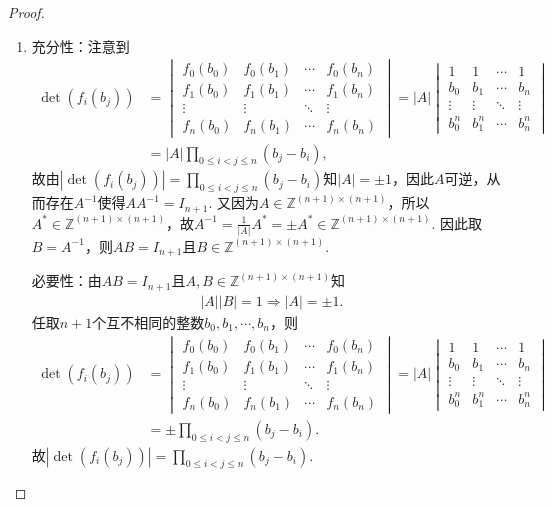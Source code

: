\documentclass[../../main.tex]{subfiles}
\begin{document}
\begin{proof}
\begin{enumerate}[(1)]
\item {\heiti 充分性：}注意到
\begin{align*}
\det(f_i(b_j))&=\begin{vmatrix}
f_0(b_0)&f_0(b_1)&\cdots&f_0(b_n)\\
f_1(b_0)&f_1(b_1)&\cdots&f_1(b_n)\\
\vdots&\vdots&\ddots&\vdots\\
f_n(b_0)&f_n(b_1)&\cdots&f_n(b_n)
\end{vmatrix}=|A|\begin{vmatrix}
1&1&\cdots&1\\
b_0&b_1&\cdots&b_n\\
\vdots&\vdots&\ddots&\vdots\\
b_0^n&b_1^n&\cdots&b_n^n
\end{vmatrix}\\
&=|A|\prod_{0\le i<j\le n}(b_j-b_i),
\end{align*}
故由$|\det(f_i(b_j))|=\prod_{0\le i<j\le n}(b_j-b_i)$知$|A|=\pm 1$，因此$A$可逆，从而存在$A^{-1}$使得$AA^{-1}=I_{n+1}$. 又因为$A\in \mathbb{Z}^{(n+1)\times(n+1)}$，所以$A^*\in \mathbb{Z}^{(n+1)\times(n+1)}$，故$A^{-1}=\frac{1}{|A|}A^*=\pm A^*\in \mathbb{Z}^{(n+1)\times(n+1)}$. 因此取$B=A^{-1}$，则$AB=I_{n+1}$且$B\in \mathbb{Z}^{(n+1)\times(n+1)}$.

{\heiti 必要性：}由$AB=I_{n+1}$且$A,B\in \mathbb{Z}^{(n+1)\times(n+1)}$知
\begin{align*}
|A||B|=1\Longrightarrow |A|=\pm 1.
\end{align*}
任取$n+1$个互不相同的整数$b_0,b_1,\cdots,b_n$，则
\begin{align*}
\det(f_i(b_j))&=\begin{vmatrix}
f_0(b_0)&f_0(b_1)&\cdots&f_0(b_n)\\
f_1(b_0)&f_1(b_1)&\cdots&f_1(b_n)\\
\vdots&\vdots&\ddots&\vdots\\
f_n(b_0)&f_n(b_1)&\cdots&f_n(b_n)
\end{vmatrix}=|A|\begin{vmatrix}
1&1&\cdots&1\\
b_0&b_1&\cdots&b_n\\
\vdots&\vdots&\ddots&\vdots\\
b_0^n&b_1^n&\cdots&b_n^n
\end{vmatrix}\\
&=\pm \prod_{0\le i<j\le n}(b_j-b_i).
\end{align*}
故$|\det(f_i(b_j))|=\prod_{0\le i<j\le n}(b_j-b_i)$.
\end{enumerate}

\end{proof}
\end{document}

